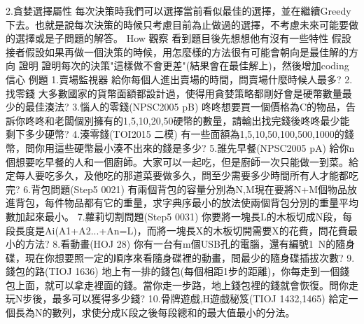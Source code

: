 \documentclass{article}
\begin{document}
                2.貪婪選擇屬性
                    每次決策時我們可以選擇當前看似最佳的選擇，並在繼續Greedy下去。也就是說每次決策的時候只考慮目前為止做過的選擇，不考慮未來可能要做的選擇或是子問題的解答。
        How
            觀察
                看到題目後先想想他有沒有一些特性
            假設
                接者假設如果再做一個決策的時候，用怎麼樣的方法很有可能會朝向是最佳解的方向
            證明
                證明每次的決策"這樣做不會更差"(結果會在最佳解上)，然後增加coding信心
    例題
        1.賣場監視器
            給你每個人進出賣場的時間，問賣場什麼時候人最多?
        2.找零錢
            大多數國家的貨幣面額都設計過，使得用貪婪策略都剛好會是硬幣數量最少的最佳湊法?
        3.惱人的零錢(NPSC2005 pB)
            咚咚想要買一個價格為C的物品，告訴你咚咚和老闆個別擁有的1,5,10,20,50硬幣的數量，請輸出找完錢後咚咚最少能剩下多少硬幣?
        4.湊零錢(TOI2015 二模)
            有一些面額為1,5,10,50,100,500,1000的錢幣，問你用這些硬幣最小湊不出來的錢是多少?
        5.誰先早餐(NPSC2005 pA)
            給你n個想要吃早餐的人和一個廚師。大家可以一起吃，但是廚師一次只能做一到菜。給定每人要吃多久，及他吃的那道菜要做多久，問至少需要多少時間所有人才能都吃完?
        6.背包問題(Step5 0021)
            有兩個背包的容量分別為N,M現在要將N+M個物品放進背包，每件物品都有它的重量，求字典序最小的放法使兩個背包分別的重量平均數加起來最小。
        7.蘿莉切割問題(Step5 0031)
            你要將一塊長L的木板切成N段，每段長度是Ai(A1+A2...+An=L)，而將一塊長X的木板切開需要X的花費，問花費最小的方法?
        8.看動畫(HOJ 28)
            你有一台有m個USB孔的電腦，還有編號1~N的隨身碟，現在你想要照一定的順序來看隨身碟裡的動畫，問最少的隨身碟插拔次數?
        9.錢包的路(TIOJ 1636)
            地上有一排的錢包(每個相距1步的距離)，你每走到一個錢包上面，就可以拿走裡面的錢。當你走一步路，地上錢包裡的錢就會恢復。問你走玩N步後，最多可以獲得多少錢?
        10.骨牌遊戲,H遊戲秘笈(TIOJ 1432,1465)
            給定一個長為N的數列，求使分成K段之後每段總和的最大值最小的分法。

\end{document}

